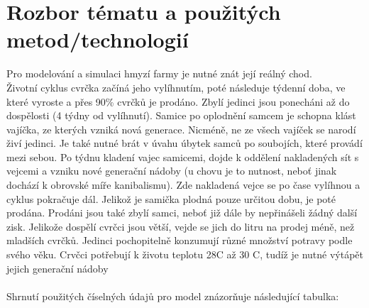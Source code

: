 \documentclass[11pt, a4paper, titlepage]{article}
\begin{document}
    \section{Rozbor tématu a použitých metod/technologií}
    Pro modelování a simulaci hmyzí farmy je nutné znát její reálný chod. \\
    Životní cyklus cvrčka začíná jeho vylíhnutím, poté následuje týdenní doba, ve které vyroste a přes 90\% cvrčků je prodáno.
    Zbylí jedinci jsou ponecháni až do dospělosti (4 týdny od vylíhnutí). Samice po oplodnění samcem je schopna klást vajíčka, ze kterých vzniká
    nová generace. Nicméně, ne ze všech vajíček se narodí živí jedinci. Je také nutné brát v úvahu úbytek samců po soubojích, které provádí mezi sebou.
    Po týdnu kladení vajec samicemi, dojde k oddělení nakladených sít s vejcemi a vzniku nové generační nádoby (u chovu je to nutnost, neboť jinak dochází
    k obrovské míře kanibalismu). Zde nakladená vejce se po čase vylíhnou a cyklus pokračuje dál. Jelikož je samička plodná pouze určitou dobu,
    je poté prodána. Prodáni jsou také zbylí samci, neboť již dále by nepřinášeli žádný další zisk. Jelikože dospělí cvrčci jsou větší,
    vejde se jich do litru na prodej méně, než mladších cvrčků. Jedinci pochopitelně konzumují různé množství potravy podle svého věku. Crvčci potřebují k
    životu teplotu 28\degree C až 30 \degree C, tudíž je nutné výtápět jejich generační nádoby\\
    \\
    Shrnutí použitých číselných údajů pro model znázorňuje následující tabulka:
\end{document}
